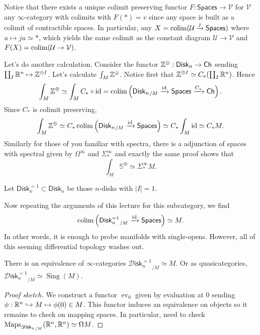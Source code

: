 \documentclass{amsart}
\DeclareMathOperator{\Sing}{Sing}
\DeclareMathOperator{\ev}{ev}
\newcommand{\disk}{\mathsf{Disk}_n}
\newcommand{\Disk}{\mathscr{D}\mathsf{isk}_n}
\begin{document}
Notice that there exists a unique colimit preserving functor $F:\mathsf{Spaces}\to \mathcal{V}$
for $\mathcal{V}$ any $\infty$-category with colimits with $F(*)=v$ since any space
is built as a colimit of contractible spaces. In particular, any $X=\operatorname*{colim}(\mathcal{U}\xrightarrow{j}\mathsf{Spaces})$
where $u\mapsto ju\simeq *$, which yields the same colimit as the constant diagram $\mathcal{U}\to \mathcal{V}$
and $F(X)=\operatorname*{colim}(\mathcal{U}\to \mathcal{V})$.

Let's do another calculation. Consider the functor $\Z^\oplus:\disk\to\mathsf{Ch}$
sending $\coprod_I \mathbb{R}^n\mapsto \mathbb{Z}^{\oplus I}$. Let's calculate $\int_M\mathbb{Z}^\oplus$.
Notice first that $\mathbb{Z}^{\oplus I}\simeq C_*(\coprod_I\mathbb{R}^n)$. Hence
\begin{equation*}
    \int_M \Z^\oplus \simeq \int_M C_*\circ \id = \colim\left( {\disk}_{/M}\xrightarrow{\id}\mathsf{Spaces}\xrightarrow{C_*}\mathsf{Ch}\right).
\end{equation*}
Since $C_*$ is colimit preserving,
\begin{equation*}
    \int_M \Z^\oplus \simeq C_*\colim\left( {\disk}_{/M}\xrightarrow{\id}\mathsf{Spaces} \right) \simeq C_*\int_M \id \simeq C_* M.
\end{equation*}
Similarly for those of you familiar with spectra, there is a adjunction of spaces with spectral
given by $\Omega^\infty$ and $\Sigma_*^\infty$ and exactly the same proof shows that
\begin{equation*}
    \int_M \mathbb{S}^\oplus \simeq \Sigma_*^\infty M.
\end{equation*}

\begin{definition}
    Let $\disk^{=1}\subset \disk$ be those $n$-disks with $|I|=1.$
\end{definition}
Now repeating the arguments of this lecture for this subcategory, we find
\begin{equation*}
    \colim\left( {\disk^{=1}}_{/M}\xrightarrow{\id}\mathsf{Spaces} \right)\simeq M.
\end{equation*}
In other words, it is enough to probe manifolds with single-opens. However,
all of this seeming differential topology washes out.
\begin{proposition}
    There is an equivalence of $\infty$-categories ${\Disk^{=1}}_{/M}\simeq M$.
    Or as quasicategories, ${\Disk^{=1}}_{/M}\simeq \Sing(M)$.
\end{proposition}
\begin{proof}[Proof sketch]
    We construct a functor $\ev_0$ given by evaluation at 0 sending $\phi:\mathbb{R}^n\hookrightarrow M\mapsto \phi(0)\in M$.
    This functor induces an equivalence on objects so it remains to check on mapping spaces.
    In particular, need to check $\Maps_{ {\Disk}_{/M}}(\R^n,\R^n)\simeq \Omega M$.
\end{proof}
\end{document}
